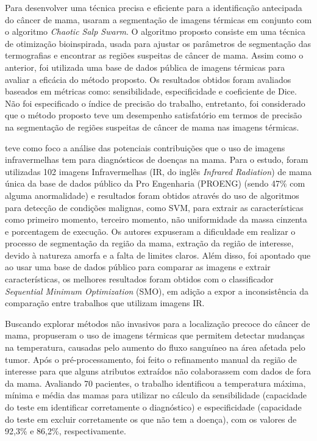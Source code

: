 Para desenvolver uma técnica precisa e eficiente para a identificação antecipada do câncer de mama,  usaram a segmentação de imagens térmicas em conjunto com o algoritmo \textit{Chaotic Salp Swarm}. O algoritmo proposto consiste em uma técnica de otimização bioinspirada, usada para ajustar os parâmetros de segmentação das termografias e encontrar as regiões suspeitas de câncer de mama. Assim como o anterior, foi utilizada uma base de dados pública de imagens térmicas para avaliar a eficácia do método proposto. Os resultados obtidos foram avaliados baseados em métricas como: sensibilidade, especificidade e coeficiente de Dice. Não foi especificado o índice de precisão do trabalho, entretanto, foi considerado que o método proposto teve um desempenho satisfatório em termos de precisão na segmentação de regiões suspeitas de câncer de mama nas imagens térmicas.

 teve como foco a análise das potenciais contribuições que o uso de imagens infravermelhas tem para diagnósticos de doenças na mama. Para o estudo, foram utilizadas 102 imagens Infravermelhas (IR, do inglês \textit{Infrared Radiation}) de mama única da base de dados público da Pro Engenharia (PROENG) (sendo 47\% com alguma anormalidade) e resultados foram obtidos através do uso de algoritmos para detecção de condições malignas, como SVM, para extrair as características como primeiro momento, terceiro momento, não uniformidade da massa cinzenta e porcentagem de execução. Os autores expuseram a dificuldade em realizar o processo de segmentação da região da mama, extração da região de interesse, devido à natureza amorfa e a falta de limites claros. Além disso, foi apontado que ao usar uma base de dados público para comparar as imagens e extrair características, os melhores resultados foram obtidos com o classificador \textit{Sequential Minimum Optimization} (SMO), em adição a expor a inconsistência da comparação entre trabalhos que utilizam imagens IR. 

Buscando explorar métodos não invasivos para a localização precoce do câncer de mama,  propuseram o uso de imagens térmicas que permitem detectar mudanças na temperatura, causadas pelo aumento do fluxo sanguíneo na área afetada pelo tumor. Após o pré-processamento, foi feito o refinamento manual da região de interesse para que alguns atributos extraídos não colaborassem com dados de fora da mama. Avaliando 70 pacientes, o trabalho identificou a temperatura máxima, mínima e média das mamas para utilizar no cálculo da sensibilidade (capacidade do teste em identificar corretamente o diagnóstico) e especificidade (capacidade do teste em excluir corretamente os que não tem a doença), com os valores de 92,3\% e 86,2\%, respectivamente.

